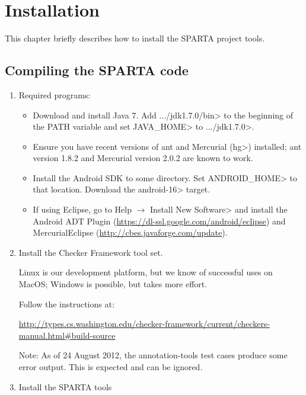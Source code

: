 \htmlhr
\chapter{Installation\label{installation}}

This chapter briefly describes how to install the SPARTA project tools.

\section{Compiling the SPARTA code}

\begin{enumerate}

\item Required programs:

\begin{itemize}
\item Download and install Java 7. Add \<.../jdk1.7.0/bin> to the
  beginning of the PATH variable and set \<JAVA\_HOME> to
  \<.../jdk1.7.0>.

\item Ensure you have recent versions of ant and Mercurial (\<hg>) installed;
  ant version 1.8.2 and Mercurial version 2.0.2 are known to work.

\item Install the Android SDK to some directory. Set \<ANDROID\_HOME> to that
  location.
  Download the \<android-16> target.

\item If using Eclipse, go to
\<Help $\rightarrow$ Install New Software>
and install the Android ADT Plugin (\url{https://dl-ssl.google.com/android/eclipse}) and MercurialEclipse (\url{http://cbes.javaforge.com/update}).

\end{itemize}


\item Install the Checker Framework tool set.

Linux is our development platform, but we know of successful uses on
MacOS; Windows is possible, but takes more effort.

Follow the instructions at:

\url{http://types.cs.washington.edu/checker-framework/current/checkers-manual.html#build-source}

Note: As of 24 August 2012, the annotation-tools test cases
produce some error output. This is expected and can be ignored.


\item
Install the SPARTA tools


\end{enumerate}
